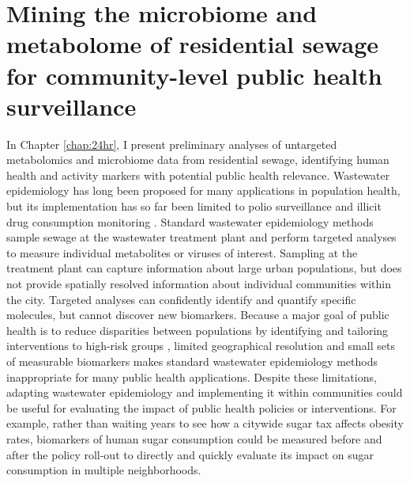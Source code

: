 \section{Mining the microbiome and metabolome of residential sewage for community-level public health surveillance}

In Chapter \ref{chap:24hr}, I present preliminary analyses of untargeted metabolomics and microbiome data from residential sewage, identifying human health and activity markers with potential public health relevance.
Wastewater epidemiology has long been proposed for many applications in population health, but its implementation has so far been limited to polio surveillance \cite{polio} and illicit drug consumption monitoring \cite{Subedi2014,Ort2014}.
Standard wastewater epidemiology methods sample sewage at the wastewater treatment plant and perform targeted analyses to measure individual metabolites or viruses of interest.
Sampling at the treatment plant can capture information about large urban populations, but does not provide spatially resolved information about individual communities within the city.
Targeted analyses can confidently identify and quantify specific molecules, but cannot discover new biomarkers.
Because a major goal of public health is to reduce disparities between populations by identifying and tailoring interventions to high-risk groups \cite{Ramaswami2018,Weeramanthri2018,Khoury2016}, limited geographical resolution and small sets of measurable biomarkers makes standard wastewater epidemiology methods inappropriate for many public health applications.
Despite these limitations, adapting wastewater epidemiology and implementing it within communities could be useful for evaluating the impact of public health policies or interventions.
For example, rather than waiting years to see how a citywide sugar tax affects obesity rates, biomarkers of human sugar consumption could be measured before and after the policy roll-out to directly and quickly evaluate its impact on sugar consumption in multiple neighborhoods.


